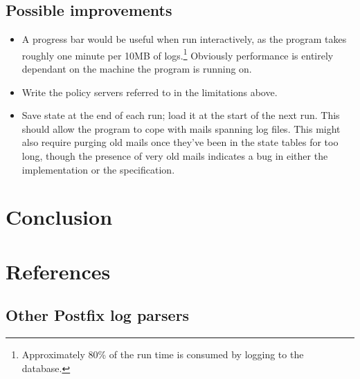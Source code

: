 \documentclass[a4paper,12pt,draft]{article}
\begin{document}
\subsection{Possible improvements}
\begin{itemize}

    \item A progress bar would be useful when run interactively, as the
        program takes roughly one minute per 10MB of
        logs.\footnote{Approximately 80\% of the run time is consumed by
        logging to the database.}  Obviously performance is entirely
        dependant on the machine the program is running on.

    \item Write the policy servers referred to in the limitations above.

    \item Save state at the end of each run; load it at the start of the
        next run.  This should allow the program to cope with mails
        spanning log files.  This might also require purging old mails once
        they've been in the state tables for too long, though the presence
        of very old mails indicates a bug in either the implementation or
        the specification.

\end{itemize}

\section{Conclusion}

\appendix


\label{conclusion}

\section{References}

\label{references}

\subsection{Other Postfix log parsers}

\label{other-parsers}
\end{document}
